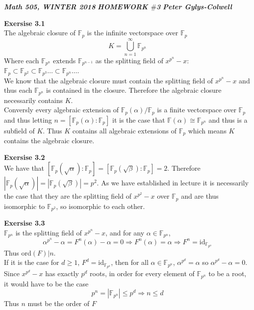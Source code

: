 \documentclass[12pt]{article}
\newenvironment{ques}[1]{\textbf{Exersise #1}\vspace{1 mm}\\ }{\bigskip}
\theoremstyle{definition}
\newcommand{\F}{\mathbb F}
\renewcommand{\a}{\alpha}
\renewcommand{\b}{\beta}
\newcommand{\id}{\text{id}}
\begin{document}
\noindent \textit{\textbf{Math 505, WINTER 2018}} \hspace{1.3cm}
\textit{\textbf{HOMEWORK $\#$3}} \hspace{1.3cm} \textit{\textbf{Peter
Gylys-Colwell}} 

\vspace{1cm}

\begin{ques}{3.1}
	The algebraic closure of $\F_p$ is the infinite vectorspace over $\F_p$
	$$K = \bigcup_{n=1}^\infty \F_{p^n}$$
	Where each $\F_{p^n}$ extends $\F_{p^{n-1}}$ as the splitting field of
	$x^{p^n} - x$: $\F_{p} \subset\F_{p^2} \subset \F_{p^3} \dots \subset
	\F_{p^n} \dots $.\\
	We know that the algebraic closure must contain the splitting field of
	$x^{p^n} - x$ and thus each $\F_{p^n}$ is contained in the closure.
	Therefore the algebraic closure necessarily contains $K$. \\
	Conversly every algebraic extension of $\F_p(\alpha)/\F_p$ is a finite
	vectorspace over $\F_p$ and thus letting $n = [\F_p(\a):\F_p]$ it is the
	case that $\F(\a) \cong \F_{p^{n}}$ and thus is a subfield of $K$. Thus $K$
	contains all algebraic extensions of $\F_p$ which means $K$ contains the
	algebraic closure.
\end{ques}

\begin{ques}{3.2}
	We have that $[\F_p(\sqrt \a):\F_p] = [\F_p(\sqrt \b):\F_p] = 2$. Therefore
	$|\F_p(\sqrt \a)| = |\F_p(\sqrt \b)| = p^2$. As we have established in
	lecture it is necessarily the case that they are the splitting field of
	$x^{p^2} - x$ over $\F_p$ and are thus isomorphic to $\F_{p^2}$, so
	isomorphic to each other.
\end{ques}

\begin{ques}{3.3}
	$\F_{p^n}$ is the splitting field of $x^{p^n} - x$, and for any $\a \in
	\F_{p^n}$, 
	$$\a^{p^n} - \a = F^n(\a) - \a = 0 \Rightarrow F^n(\a) = \a \Rightarrow F^n =
	\id_{\F_{p^n}}$$
	Thus ord$(F) |n$.\\
	If it is the case for $d \geq 1$, $F^d = \id_{\F_{p^n}}$, then for all $\a
	\in \F_{p^n}$, $\a^{p^d} = \a$ so $\a^{p^d} - \a = 0$. Since $x^{p^d} - x$
	has exactly $p^d$ roots, in order for every element of $\F_{p^n}$ to be a
	root, it would have to be the case 
	$$p^n = |\F_{p^n}| \leq p^d \Rightarrow n \leq d$$
	Thus $n$ must be the order of $F$
\end{ques}
\end{document}
